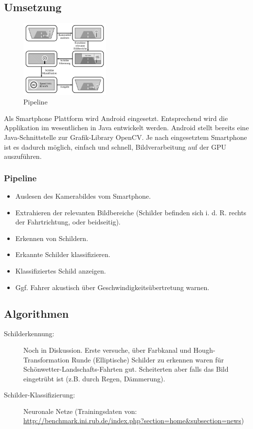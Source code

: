 \subsection*{Umsetzung}
    \begin{figure}
            \includegraphics[width=0.4\textwidth]{pipeline.pdf}
            \caption{Pipeline}
    \end{figure}
    Als Smartphone Plattform wird Android eingesetzt. Entsprechend wird die Applikation im wesentlichen in Java entwickelt werden. Android stellt bereits eine Java-Schnittstelle zur Grafik-Library
    OpenCV. Je nach eingesetztem Smartphone ist es dadurch möglich, einfach und schnell, Bildverarbeitung auf der GPU auszuführen.

\subsubsection*{Pipeline}
    \begin{itemize}
        \item Auslesen des Kamerabildes vom Smartphone.
        \item Extrahieren der relevanten Bildbereiche (Schilder befinden sich i. d. R. rechts der Fahrtrichtung, oder beidseitig).
        \item Erkennen von Schildern.
        \item Erkannte Schilder klassifizieren.
        \item Klassifiziertes Schild anzeigen.
        \item Ggf. Fahrer akustisch über Geschwindigkeitsübertretung warnen.
    \end{itemize}
\subsection*{Algorithmen}
    \begin{description}
        \item[Schilderkennung:] Noch in Diskussion. Erste versuche, über Farbkanal und Hough-Transformation
            Runde (Elliptische) Schilder zu erkennen waren für Schönwetter-Landschafts-Fahrten gut. Scheiterten
            aber falls das Bild eingetrübt ist (z.B. durch Regen, Dämmerung).
        \item[Schilder-Klassifizierung:] Neuronale Netze (Trainingsdaten von: \url{http://benchmark.ini.rub.de/index.php?section=home&subsection=news})
    \end{description}
